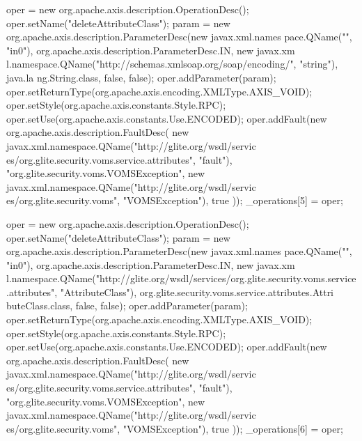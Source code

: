 \begin{DoxyCode}
{        oper = new org.apache.axis.description.OperationDesc();
        oper.setName("deleteAttributeClass");
        param = new org.apache.axis.description.ParameterDesc(new javax.xml.names
      pace.QName("", "in0"), org.apache.axis.description.ParameterDesc.IN, new javax.xm
      l.namespace.QName("http://schemas.xmlsoap.org/soap/encoding/", "string"), java.la
      ng.String.class, false, false);
        oper.addParameter(param);
        oper.setReturnType(org.apache.axis.encoding.XMLType.AXIS_VOID);
        oper.setStyle(org.apache.axis.constants.Style.RPC);
        oper.setUse(org.apache.axis.constants.Use.ENCODED);
        oper.addFault(new org.apache.axis.description.FaultDesc(
                      new javax.xml.namespace.QName("http://glite.org/wsdl/servic
      es/org.glite.security.voms.service.attributes", "fault"),
                      "org.glite.security.voms.VOMSException",
                      new javax.xml.namespace.QName("http://glite.org/wsdl/servic
      es/org.glite.security.voms", "VOMSException"), 
                      true
                     ));
        _operations[5] = oper;

        oper = new org.apache.axis.description.OperationDesc();
        oper.setName("deleteAttributeClass");
        param = new org.apache.axis.description.ParameterDesc(new javax.xml.names
      pace.QName("", "in0"), org.apache.axis.description.ParameterDesc.IN, new javax.xm
      l.namespace.QName("http://glite.org/wsdl/services/org.glite.security.voms.service
      .attributes", "AttributeClass"), org.glite.security.voms.service.attributes.Attri
      buteClass.class, false, false);
        oper.addParameter(param);
        oper.setReturnType(org.apache.axis.encoding.XMLType.AXIS_VOID);
        oper.setStyle(org.apache.axis.constants.Style.RPC);
        oper.setUse(org.apache.axis.constants.Use.ENCODED);
        oper.addFault(new org.apache.axis.description.FaultDesc(
                      new javax.xml.namespace.QName("http://glite.org/wsdl/servic
      es/org.glite.security.voms.service.attributes", "fault"),
                      "org.glite.security.voms.VOMSException",
                      new javax.xml.namespace.QName("http://glite.org/wsdl/servic
      es/org.glite.security.voms", "VOMSException"), 
                      true
                     ));
        _operations[6] = oper;

}
\end{DoxyCode}
